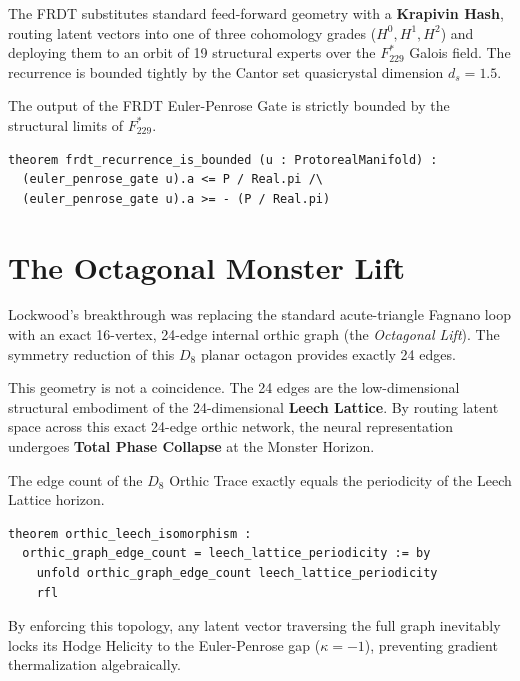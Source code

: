 The FRDT substitutes standard feed-forward geometry with a \textbf{Krapivin Hash}, routing latent vectors into one of three cohomology grades ($H^0, H^1, H^2$) and deploying them to an orbit of 19 structural experts over the $F_{229}^*$ Galois field. The recurrence is bounded tightly by the Cantor set quasicrystal dimension $d_s = 1.5$. 

\begin{theorem}
The output of the FRDT Euler-Penrose Gate is strictly bounded by the structural limits of $F_{229}^*$. 
\end{theorem}
\begin{center}
\begin{minipage}{0.8\textwidth}
\begin{lstlisting}
theorem frdt_recurrence_is_bounded (u : ProtorealManifold) :
  (euler_penrose_gate u).a <= P / Real.pi /\ 
  (euler_penrose_gate u).a >= - (P / Real.pi)
\end{lstlisting}
\end{minipage}
\end{center}

\section{The Octagonal Monster Lift}
Lockwood's breakthrough was replacing the standard acute-triangle Fagnano loop with an exact 16-vertex, 24-edge internal orthic graph (the \emph{Octagonal Lift}). The symmetry reduction of this $D_8$ planar octagon provides exactly 24 edges.

This geometry is not a coincidence. The 24 edges are the low-dimensional structural embodiment of the 24-dimensional \textbf{Leech Lattice}. By routing latent space across this exact 24-edge orthic network, the neural representation undergoes \textbf{Total Phase Collapse} at the Monster Horizon.

\begin{theorem}
The edge count of the $D_8$ Orthic Trace exactly equals the periodicity of the Leech Lattice horizon.
\end{theorem}
\begin{center}
\begin{minipage}{0.8\textwidth}
\begin{lstlisting}
theorem orthic_leech_isomorphism : 
  orthic_graph_edge_count = leech_lattice_periodicity := by
    unfold orthic_graph_edge_count leech_lattice_periodicity
    rfl
\end{lstlisting}
\end{minipage}
\end{center}

By enforcing this topology, any latent vector traversing the full graph inevitably locks its Hodge Helicity to the Euler-Penrose gap ($\kappa = -1$), preventing gradient thermalization algebraically.
